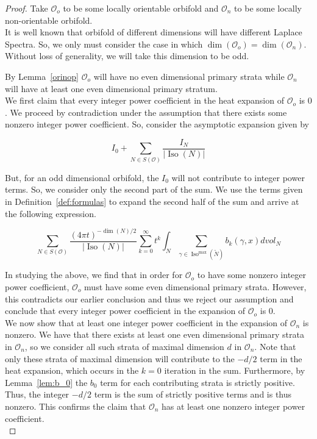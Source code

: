 \documentclass{amsart}
\theoremstyle{plain}
\theoremstyle{definition}
\theoremstyle{remark}
\newcommand{\myabs}[1]{\vert#1\vert}
\newcommand{\orb}{\mathcal O}
\DeclareMathOperator{\iso}{Iso}
\begin{document}
\begin{proof}
Take $\orb_o$ to be some locally orientable orbifold and $\orb_n$ to be
some locally non-orientable orbifold.\\

It is well known that orbifold of different dimensions will have different
Laplace Spectra. So, we only must consider the case in which $\dim(\orb_o)
= \dim(\orb_n)$. Without loss of generality, we will take this dimension to
be odd. 


By Lemma~\ref{orinop} $\orb_o$ will have no even dimensional primary strata while
$\orb_n$ will have at least one even dimensional primary stratum.\\

We first claim that every integer power coefficient in the heat expansion
of $\orb_o$ is $0$. We proceed by contradiction under the assumption that
there exists some nonzero integer power coefficient. So, consider the asymptotic expansion given by

\begin{equation*}
    I_0 + \sum_{N \in S(\orb)} \frac{I_N}{\myabs{\iso(N)}}
\end{equation*}

But, for an odd dimensional orbifold, the $I_0$ will not contribute to
integer power terms. So, we consider only the second part of the sum. We
use the terms given in Definition~\ref{def:formulas} to expand the second
half of the sum and arrive at the following expression.

\begin{equation*}
    \sum_{N \in S(\mathcal{O})}\frac{{(4\pi
    t)}^{-\dim(N)/2}}{\myabs{\iso(N)}}\sum_{k=0}^{\infty}t^k\int_{N}
    \sum_{\gamma \in \iso^{\max}(\widetilde{N})}b_k(\gamma,x) dvol_N
\end{equation*}

In studying the above, we find that in order for $\orb_o$ to have some
nonzero integer power coefficient, $\orb_o$ must have some even dimensional
primary strata. However, this contradicts our earlier conclusion and thus
we reject our assumption and conclude that every integer power coefficient
in the expansion of $\orb_o$ is $0$.\\

We now show that at least one integer power coefficient in the expansion of
$\orb_n$ is nonzero. We have that there exists at least one even
dimensional primary strata in $\orb_n$, so we consider all such strata of
maximal dimension $d$ in $\orb_n$. Note that only these strata of maximal
dimension will contribute to the $-d/2$ term in the heat expansion, which
occurs in the $k=0$ iteration in the sum. Furthermore, by Lemma~\ref{lem:b_0} the
$b_0$ term for each contributing strata is strictly positive. Thus, the
integer $-d/2$ term is the sum of strictly positive terms and is thus
nonzero. This confirms the claim that $\orb_n$ has at least one nonzero
integer power coefficient.\\


\end{proof}
\end{document}
